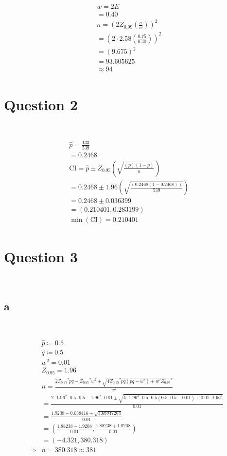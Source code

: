 \documentclass{article}
\begin{document}
~

\begin{align*}
    &\mathit{w}=2E\\
    &=0.40\\
    &n=(2Z_{0.99}(\frac{\sigma}{\mathit{w}}))^2\\
    &=(2\cdot2.58(\frac{0.75}{0.40}))^2\\
    &=(9.675)^2\\
    &=93.605625\\
    &\approx94\\
\end{align*}

\newpage

\section*{Question 2}

~

\begin{align*}
    &\hat{p}=\frac{133}{539}\\
    &=0.2468\\
    &\text{CI}=\hat{p}\pm Z_{0.95}(\sqrt{\frac{(\hat{p})(1-\hat{p})}{n}})\\
    &=0.2468\pm1.96(\sqrt{\frac{(0.2468(1-0.2468))}{539}})\\
    &=0.2468\pm0.036399\\
    &=(0.210401,0.283199)\\
    &\min(\text{CI})=0.210401\\
\end{align*}

\newpage

\section*{Question 3}

~

\subsection*{a}

~

\begin{align*}
    &\hat{p}\coloneqq 0.5\\
    &\hat{q}\coloneqq 0.5\\
    &\mathit{w}^2=0.01\\
    &Z_{0.95}=1.96\\
    &n=\frac{2{Z_{0.95}}^2\hat{p}\hat{q}-{Z_{0.95}}^2\mathit{w}^2\pm\sqrt{4{Z_{0.95}}^2\hat{p}\hat{q}(\hat{p}\hat{q}-\mathit{w}^2)+\mathit{w}^2{Z_{0.95}}^4}}{\mathit{w}^2}\\
    &=\frac{2\cdot1.96^2\cdot0.5\cdot0.5-1.96^2\cdot0.01\pm\sqrt{4\cdot1.96^4\cdot0.5\cdot0.5(0.5\cdot0.5-0.01)+0.01\cdot1.96^4}}{0.01}\\
    &=\frac{1.9208-0.038416\pm\sqrt{3.68947264}}{0.01}\\
    &=(\frac{1.88238-1.9208}{0.01},\frac{1.88238+1.9208}{0.01})\\
    &=(-4.321,380.318)\\
    \Rightarrow&n=380.318\approx381\\
\end{align*}
\end{document}
